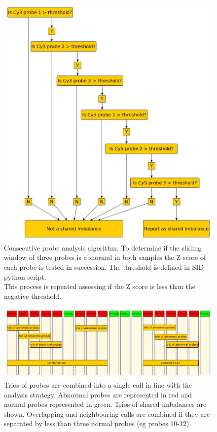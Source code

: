 \begin{figure}
\centering
\includegraphics[width=1\linewidth]{./Figures/consecutiveprobeanalysis}
\caption[Consecutive probe analysis algorithm]{Consecutive probe analysis algorithm. To determine if the sliding window of three probes is abnormal in both samples the Z score of each probe is tested in succession. The threshold is defined in SID python script.\\
This process is repeated assessing if the Z score is less than the negative threshold.}
\label{fig:consecutiveprobeanalysis}
\end{figure}

\begin{figure}
\centering
\includegraphics[width=1\linewidth]{./Figures/combiningtrioofprobes}
\caption[Trios of abnormal probes are combined into a single call ]{Trios of probes are combined into a single call in line with the analysis strategy. Abnormal probes are represented in red and normal probes represented in green. Trios of shared imbalances are shown. Overlapping and neighbouring calls are combined if they are separated by less than three normal probes (eg probes 10-12).}
\label{fig:combiningtrioofprobes}
\end{figure}

